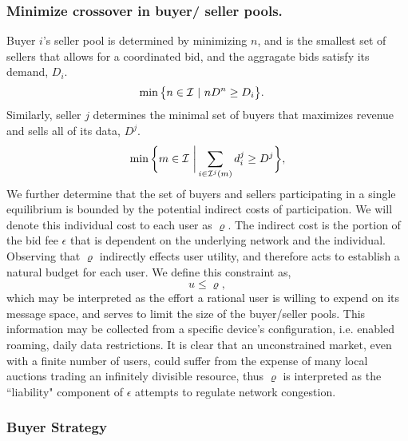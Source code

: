 \subsubsection{Minimize crossover in buyer/ seller pools.}
Buyer $i$'s seller pool is determined by minimizing $n$, and is the smallest set of sellers that
allows for a coordinated bid, and the aggragate bids satisfy its demand, $D_i$.
\begin{align}
\begin{split}\label{buyercoordinate}
    \min\big\lbrace n \in \mathcal{I} \ &\vert \ n D^n\ge D_i \big\rbrace. 
\end{split}
\end{align}
Similarly, seller $j$ determines the minimal set of buyers that maximizes revenue and
sells all of its data, $D^j$.
\begin{equation}\label{sellercoordinate}
    \min\bigg\lbrace m \in\mcI \ \bigg\vert\displaystyle\sum_{i\in\mcI^j(m)}d_i^j
\ge D^j \bigg\rbrace,
\end{equation} 
We further determine that the set of buyers and sellers participating
in a single equilibrium is bounded by the potential indirect costs of
participation. We will denote this individual cost to each user as
$\varrho$. The indirect cost is the portion of the bid fee
$\epsilon$ that is dependent on the underlying network and the individual.
Observing that $\varrho$ indirectly effects user utility,
and therefore acts to establish a natural budget for each user. We define this
constraint as, 
\begin{equation}\label{poolbnd}
    u \le \varrho,
\end{equation}
which may be interpreted as the effort a rational user is willing to expend
on its message space, and serves to limit the size of the buyer/seller pools. 
This information may be collected from a specific
device's configuration, i.e. enabled roaming, daily data restrictions.
It is clear that an unconstrained
market, even with a finite number of users, could suffer from the
expense of many local auctions trading an infinitely divisible resource, thus
$\varrho$ is interpreted as
the ``liability" component of $\epsilon$ attempts to regulate network congestion. 

\subsubsection{Buyer Strategy}
 

